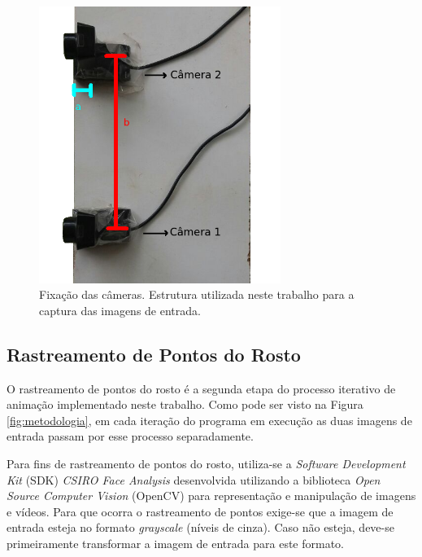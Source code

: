 \begin{figure}[!htb]
\centering
\includegraphics[width=0.7\textwidth]{figs/setupExperimento-marcado_edit-2.png}
\caption{Fixação das câmeras. Estrutura utilizada neste trabalho para a captura das imagens de entrada.}
\label{fig:setupCameras}
\end{figure}



\subsection{Rastreamento de Pontos do Rosto}

O rastreamento de pontos do rosto é a segunda etapa do processo iterativo de
animação implementado neste trabalho. Como pode ser visto na Figura
\ref{fig:metodologia}, em cada iteração do programa em execução as duas imagens
de entrada passam por esse processo separadamente.

Para fins de rastreamento de pontos do rosto, utiliza-se a
 \textit{Software
Development Kit} (SDK) \textit{CSIRO Face Analysis} \cite{cox2013csiro}
desenvolvida utilizando a biblioteca  \textit{Open Source Computer Vision} (OpenCV) para
representação e manipulação de imagens e vídeos. Para que ocorra o rastreamento
de pontos exige-se que a imagem de entrada esteja no formato \textit{grayscale}
(níveis de cinza). Caso não esteja, deve-se primeiramente transformar a imagem
de entrada para este formato. 

